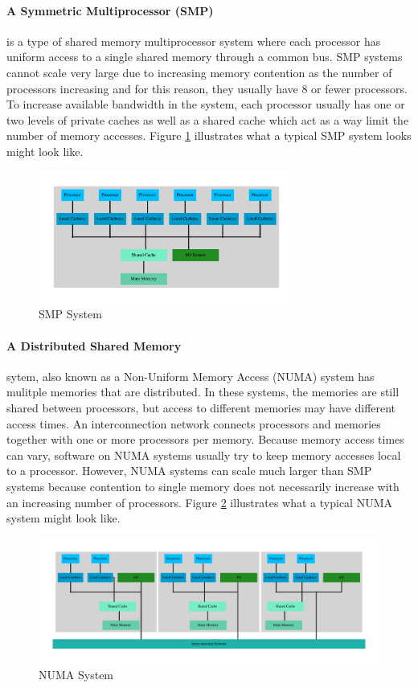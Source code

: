 \documentclass[11pt]{book}
\begin{document}
\paragraph{A Symmetric Multiprocessor (SMP)} is a type of shared memory multiprocessor
system where each processor has uniform access to a single shared memory through a common
bus.  SMP systems cannot scale very large due to increasing memory contention as the number of
processors increasing and for this reason, they usually have 8 or fewer processors.
To increase available bandwidth in the system, each processor usually has one or two
levels of private caches as well as a shared cache which act as a way limit the number of
memory accesses.  Figure \ref{smp} illustrates what a typical SMP system looks might look
like.

\begin{figure}[H]
    \centering
    \includegraphics[width=0.75\textwidth,quiet]{figs/graphviz/smp.pdf}
    \caption{SMP System}\label{smp}
\end{figure}

\paragraph{A Distributed Shared Memory} sytem, also known as a Non-Uniform Memory Access
(NUMA) system has mulitple memories that are distributed.  In these systems, the memories are
still shared between processors, but access to different memories may have different access
times.  An interconnection network connects processors and memories together with one or
more processors per memory.  Because memory access times can vary, software on NUMA systems
usually try to keep memory accesses local to a processor.  However, NUMA systems can scale
much larger than SMP systems because contention to single memory does not necessarily increase
with an increasing number of processors.  Figure \ref{distributed} illustrates what a typical
NUMA system might look like.

\begin{figure}[H]
    \centering
    \includegraphics[width=\textwidth,quiet]{figs/graphviz/distributed.pdf}
    \caption{NUMA System}\label{distributed}
\end{figure}
\end{document}
